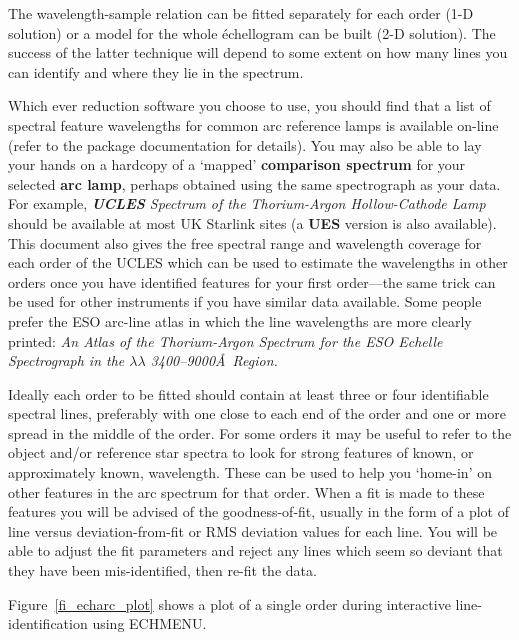 \documentclass[twoside,11pt]{article}
\newcommand{\htmlref}[2]{#1}
\newcommand{\xref}[3]{#1}
\newcommand{\sgspec}[2]{#1}
\newcommand{\sgspec}[2]{#2}
\begin{document}
The wavelength-sample relation can be fitted separately for each order
(1-D solution) or a model for the whole \'{e}chellogram can be built
(2-D solution)\@.  The success of the latter technique will depend to
some extent on how many lines you can identify and where they lie in
the spectrum.

Which ever reduction software you choose to use, you should find that a
list of spectral feature wavelengths for common arc reference lamps is
available on-line (refer to the package documentation for details).
You may also be able to lay your hands on a hardcopy of a `mapped'
\htmlref{{\bf comparison spectrum}}{gl_comparison} for your selected
\htmlref{{\bf arc lamp}}{gl_arc},  perhaps obtained using
the same spectrograph as your data.  For example, {\sl
\htmlref{{\bf UCLES}}{gl_ucles} Spectrum
of the Thorium-Argon Hollow-Cathode Lamp} should be available at most UK
Starlink sites (a \htmlref{{\bf UES}}{gl_ues} version is also available).
This document also gives the free spectral range and wavelength coverage
for each order of the UCLES which can be used to estimate the wavelengths
in other orders once you have identified features for your first
order\sgspec{---}{ - }the same trick can be used
for other instruments if you have similar data available.
Some people prefer the ESO arc-line atlas in which the line wavelengths
are more clearly printed:
{\sl An Atlas of the Thorium-Argon Spectrum for the ESO Echelle
Spectrograph in the $\lambda\lambda$ 3400\sgspec{--}{-}9000\AA\ Region.}

Ideally each order to be fitted should contain at least three or four
identifiable
spectral lines, preferably with one close to each end of the order and one
or more spread in the middle of the order.  For some
orders it may be useful to refer to the object and/or reference star
spectra to look for strong features of known, or approximately known,
wavelength.  These can be used to help you `home-in' on other features
in the arc spectrum for that order.
When a fit is made to these features you will be advised of the
goodness-of-fit, usually in the form of a plot of line versus
deviation-from-fit or RMS deviation values for each line.
You will be able to adjust the fit parameters and reject any lines which
seem so deviant that they have been mis-identified, then re-fit the data.

\sgspec{Figure~\ref{fi_echarc_plot}}{The figure above}
shows a plot of a single order
during interactive line-identification using \xref{ECHMENU}{sun152}{}.
\end{document}
